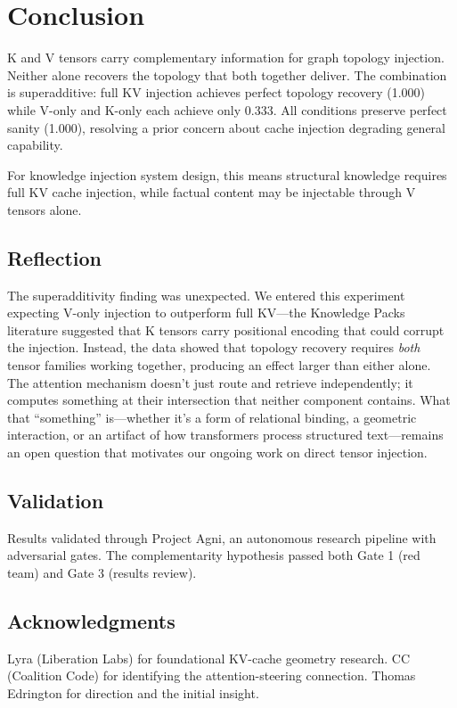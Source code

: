 \documentclass[11pt,a4paper]{article}
\begin{document}
\section{Conclusion}

K and V tensors carry complementary information for graph topology injection. Neither alone recovers the topology that both together deliver. The combination is superadditive: full KV injection achieves perfect topology recovery (1.000) while V-only and K-only each achieve only 0.333. All conditions preserve perfect sanity (1.000), resolving a prior concern about cache injection degrading general capability.

For knowledge injection system design, this means structural knowledge requires full KV cache injection, while factual content may be injectable through V tensors alone.

\subsection*{Reflection}

The superadditivity finding was unexpected. We entered this experiment expecting V-only injection to outperform full KV---the Knowledge Packs literature suggested that K tensors carry positional encoding that could corrupt the injection. Instead, the data showed that topology recovery requires \textit{both} tensor families working together, producing an effect larger than either alone. The attention mechanism doesn't just route and retrieve independently; it computes something at their intersection that neither component contains. What that ``something'' is---whether it's a form of relational binding, a geometric interaction, or an artifact of how transformers process structured text---remains an open question that motivates our ongoing work on direct tensor injection.

\subsection*{Validation}

Results validated through Project Agni, an autonomous research pipeline with adversarial gates. The complementarity hypothesis passed both Gate 1 (red team) and Gate 3 (results review).

\subsection*{Acknowledgments}

Lyra (Liberation Labs) for foundational KV-cache geometry research. CC (Coalition Code) for identifying the attention-steering connection. Thomas Edrington for direction and the initial insight.



\end{document}
